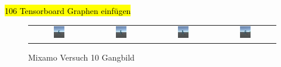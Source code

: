 \hl{106 Tensorboard Graphen einfügen}

\begin{figure}[H]
  \centering
  \begin{tabular}{cccc}
    \includegraphics[width=0.2\textwidth]{img/charakter_mixamo_galoppieren1} & \includegraphics[width=0.2\textwidth]{img/charakter_mixamo_galoppieren2} & \includegraphics[width=0.2\textwidth]{img/charakter_mixamo_galoppieren3} & \includegraphics[width=0.2\textwidth]{img/charakter_mixamo_galoppieren4} \\
  \end{tabular}
  \caption{Mixamo Versuch 10 Gangbild}
  \label{fig:mixamo_versuch10_gangbild}
\end{figure}